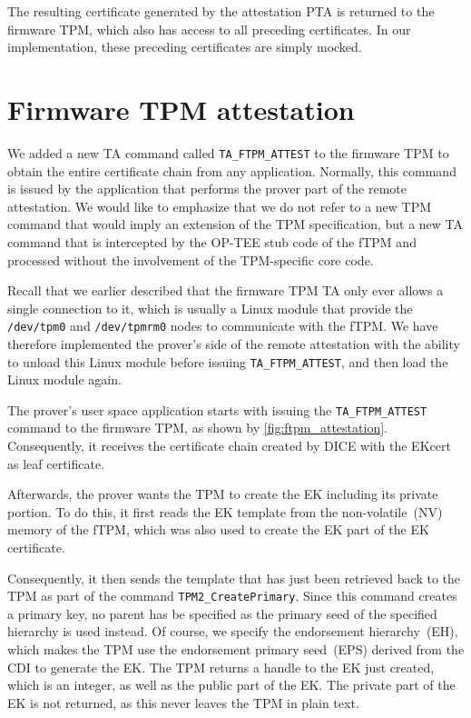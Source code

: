The resulting certificate generated by the attestation PTA is returned to the firmware TPM, which also has access to all preceding certificates.
In our implementation, these preceding certificates are simply mocked.

\section{Firmware TPM attestation}\label{sec:impl_ftpm_attestation}



We added a new TA command called \texttt{TA\_FTPM\_ATTEST} to the firmware TPM to obtain the entire certificate chain from any application.
Normally, this command is issued by the application that performs the prover part of the remote attestation.
We would like to emphasize that we do not refer to a new TPM command that would imply an extension of the TPM specification, but a new TA command that is intercepted by the OP-TEE stub code of the fTPM and processed without the involvement of the TPM-specific core code.

Recall that we earlier described that the firmware TPM TA only ever allows a single connection to it, which is usually a Linux module that provide the \texttt{/dev/tpm0} and \texttt{/dev/tpmrm0} nodes to communicate with the fTPM\@.
We have therefore implemented the prover's side of the remote attestation with the ability to unload this Linux module before issuing \texttt{TA\_FTPM\_ATTEST}, and then load the Linux module again.

The prover's user space application starts with issuing the \texttt{TA\_FTPM\_ATTEST} command to the firmware TPM, as shown by \autoref{fig:ftpm_attestation}.
Consequently, it receives the certificate chain created by DICE with the EKcert as leaf certificate.

Afterwards, the prover wants the TPM to create the EK including its private portion.
To do this, it first reads the EK template from the non-volatile~(NV) memory of the fTPM, which was also used to create the EK part of the EK certificate.

Consequently, it then sends the template that has just been retrieved back to the TPM as part of the command \texttt{TPM2\_CreatePrimary}.
Since this command creates a primary key, no parent has be specified as the primary seed of the specified hierarchy is used instead.
Of course, we specify the endorsement hierarchy~(EH), which makes the TPM use the endorsement primary seed~(EPS) derived from the CDI to generate the EK\@.
The TPM returns a handle to the EK just created, which is an integer, as well as the public part of the EK\@.
The private part of the EK is not returned, as this never leaves the TPM in plain text.

